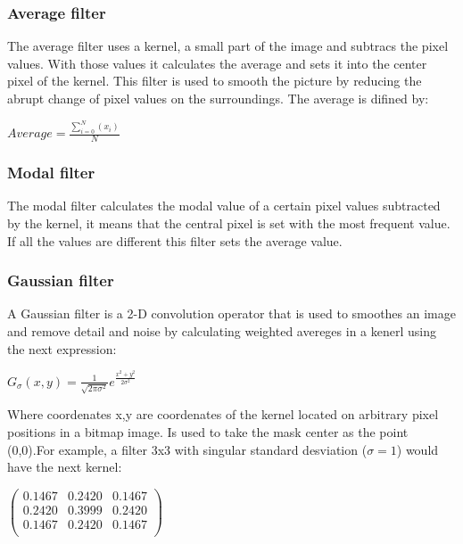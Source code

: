 \documentclass[a4paper]{article}
\begin{document}
\subsubsection{Average filter}

The average filter uses a kernel, a small part of the image and subtracs the pixel values. With those values it calculates the average and sets it into the center pixel of the kernel. This filter is used to smooth the picture by reducing the abrupt change of pixel values on the surroundings. The average is difined by:\\

\begin{center}
\begin{math}
Average= \frac{\sum \limits_{i=0}^{N}\!\!(x_i)}{N}
\end{math}
\end{center}


\subsubsection{Modal filter}

The modal filter calculates the modal value of a certain pixel values subtracted by the kernel, it means that the central pixel is set with the most frequent value. If all the values are different this filter sets the average value.

\subsubsection{Gaussian filter}

A Gaussian filter is a 2-D convolution operator that is used to smoothes an image and remove detail and noise by calculating weighted avereges in a kenerl using the next expression:\\

\begin{center}
\begin{math}
G_{\sigma}(x,y)=\frac{1}{\sqrt{2\pi\sigma^2}}e^\frac{x^2+y^2}{2\sigma^2}
\end{math}
\end{center}
Where coordenates x,y are coordenates of the kernel located on arbitrary pixel positions in a bitmap image. Is used to take the mask center as the point (0,0).For example, a filter 3x3 with singular standard desviation ($\sigma=1$) would have the next kernel:

\begin{center}
\begin{math}
\begin{pmatrix} 
   0.1467 &0.2420 & 0.1467 \\ 
   0.2420 & 0.3999 & 0.2420 \\
   0.1467 & 0.2420 & 0.1467 \\ 
\end{pmatrix}
\end{math}\\
\end{center}
\end{document}
